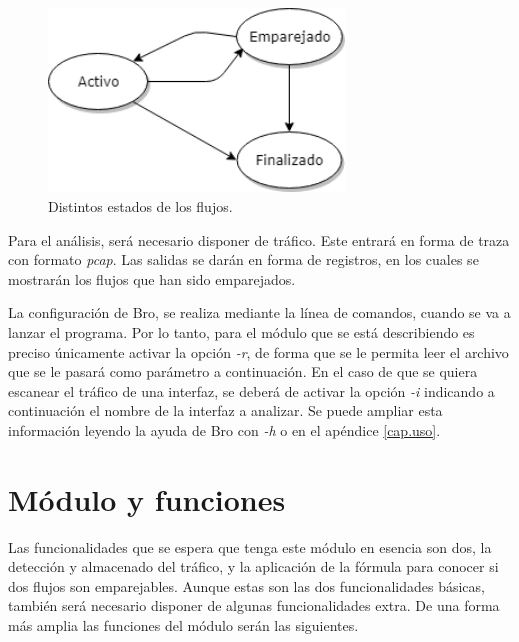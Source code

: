 \begin{figure}[H]
  \includegraphics[width=0.7\textwidth]{imagenes/flujos.png}
  \centering
  \caption{Distintos estados de los flujos.}\label{fig.flujos}
\end{figure}

\intro Para el análisis, será necesario disponer de tráfico. Este entrará en forma de traza con formato \textit{pcap}. Las salidas 
se darán en forma de registros, en los cuales se mostrarán los flujos que han sido emparejados.

\intro La configuración de Bro, se realiza mediante la línea de comandos, cuando se va a lanzar el programa. Por lo tanto, para el 
módulo que se está describiendo es preciso únicamente activar la opción \textit{-r}, de forma que se le permita leer el archivo que se 
le pasará como parámetro a continuación. En el caso de que se quiera escanear el tráfico de una interfaz, se deberá de activar la 
opción \textit{-i} indicando a continuación el nombre de la interfaz a analizar. Se puede ampliar esta información leyendo la ayuda de 
Bro con \textit{-h} o en el apéndice \ref{cap.uso}.

\section{Módulo y funciones}

Las funcionalidades que se espera que tenga este módulo en esencia son dos, la detección y almacenado 
del tráfico, y la aplicación de la fórmula para conocer si dos flujos son emparejables. Aunque estas son las dos funcionalidades 
básicas, también será necesario disponer de algunas funcionalidades extra. De una forma más amplia las funciones del módulo serán las 
siguientes. 

